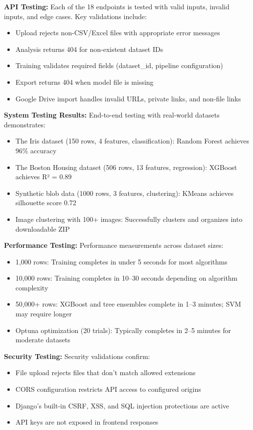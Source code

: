\documentclass[12pt,a4paper]{report}
\begin{document}
\textbf{API Testing:}
Each of the 18 endpoints is tested with valid inputs, invalid inputs, and edge cases. Key validations include:
\begin{itemize}
    \item Upload rejects non-CSV/Excel files with appropriate error messages
    \item Analysis returns 404 for non-existent dataset IDs
    \item Training validates required fields (dataset\_id, pipeline configuration)
    \item Export returns 404 when model file is missing
    \item Google Drive import handles invalid URLs, private links, and non-file links
\end{itemize}

\textbf{System Testing Results:}
End-to-end testing with real-world datasets demonstrates:
\begin{itemize}
    \item The Iris dataset (150 rows, 4 features, classification): Random Forest achieves 96\% accuracy
    \item The Boston Housing dataset (506 rows, 13 features, regression): XGBoost achieves R² = 0.89
    \item Synthetic blob data (1000 rows, 3 features, clustering): KMeans achieves silhouette score 0.72
    \item Image clustering with 100+ images: Successfully clusters and organizes into downloadable ZIP
\end{itemize}

\textbf{Performance Testing:}
Performance measurements across dataset sizes:
\begin{itemize}
    \item 1,000 rows: Training completes in under 5 seconds for most algorithms
    \item 10,000 rows: Training completes in 10--30 seconds depending on algorithm complexity
    \item 50,000+ rows: XGBoost and tree ensembles complete in 1--3 minutes; SVM may require longer
    \item Optuna optimization (20 trials): Typically completes in 2--5 minutes for moderate datasets
\end{itemize}

\textbf{Security Testing:}
Security validations confirm:
\begin{itemize}
    \item File upload rejects files that don't match allowed extensions
    \item CORS configuration restricts API access to configured origins
    \item Django's built-in CSRF, XSS, and SQL injection protections are active
    \item API keys are not exposed in frontend responses
\end{itemize}
\end{document}
